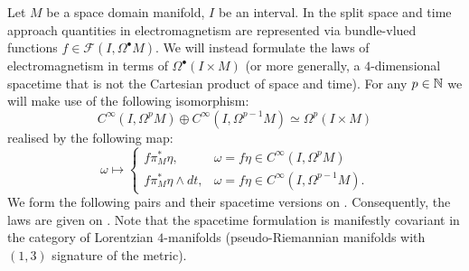 \begin{discussion}
  Let $M$ be a space domain manifold, $I$ be an interval.
  In the split space and time approach quantities in electromagnetism are
  represented via bundle-vlued functions
  $f \in \mathcal{F}(I, \Omega^\bullet M)$.
  We will instead formulate the laws of electromagnetism in terms of
  $\Omega^\bullet (I \times M)$ (or more generally, a $4$-dimensional spacetime
  that is not the Cartesian product of space and time).
  For any $p \in \mathbb{N}$ we will make use of the following isomorphism:
  \begin{equation}
    C^\infty(I, \Omega^p M) \oplus C^\infty(I, \Omega^{p - 1} M)
    \simeq \Omega^p(I \times M)
  \end{equation}
  realised by the following map:
  \begin{equation}
    \omega \mapsto
    \begin{cases}
      f \pi_M^* \eta, & \omega = f \eta \in C^\infty(I, \Omega^p M) \\
      f \pi_M^* \eta \wedge d t,
      & \omega = f \eta \in C^\infty(I, \Omega^{p - 1} M).
    \end{cases}
  \end{equation}
  We form the following pairs and their spacetime versions on 
  .
  Consequently, the laws are given on
  .
  Note that the spacetime formulation is manifestly covariant in the category of
  Lorentzian $4$-manifolds (pseudo-Riemannian manifolds with $(1, 3)$ signature
  of the metric).
\end{discussion}
